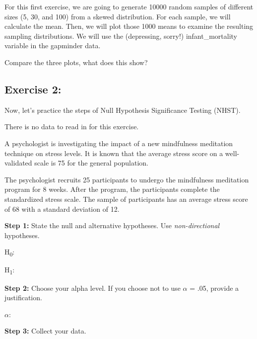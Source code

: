\documentclass[
  letterpaper,
  DIV=11,
  numbers=noendperiod]{scrartcl}
\begin{document}
For this first exercise, we are going to generate 10000 random samples
of different sizes (5, 30, and 100) from a skewed distribution. For each
sample, we will calculate the mean. Then, we will plot those 1000 means
to examine the resulting sampling distributions. We will use the
(depressing, sorry!) infant\_mortality variable in the gapminder data.

Compare the three plots, what does this show?

\subsection{Exercise 2:}\label{exercise-2}

Now, let's practice the steps of Null Hypothesis Significance Testing
(NHST).

\begin{tcolorbox}[enhanced jigsaw, opacityback=0, colbacktitle=quarto-callout-note-color!10!white, colback=white, toptitle=1mm, title=\textcolor{quarto-callout-note-color}{\faInfo}\hspace{0.5em}{Note}, left=2mm, colframe=quarto-callout-note-color-frame, coltitle=black, bottomtitle=1mm, titlerule=0mm, leftrule=.75mm, toprule=.15mm, rightrule=.15mm, bottomrule=.15mm, arc=.35mm, opacitybacktitle=0.6, breakable]

There is no data to read in for this exercise.

\end{tcolorbox}

A psychologist is investigating the impact of a new mindfulness
meditation technique on stress levels. It is known that the average
stress score on a well-validated scale is 75 for the general population.

The psychologist recruits 25 participants to undergo the mindfulness
meditation program for 8 weeks. After the program, the participants
complete the standardized stress scale. The sample of participants has
an average stress score of 68 with a standard deviation of 12.

\textbf{Step 1:} State the null and alternative hypotheses. Use
\emph{non-directional} hypotheses.

H\textsubscript{0}:

H\textsubscript{1}:

\textbf{Step 2:} Choose your alpha level. If you choose not to use
\(\alpha\) = .05, provide a justification.

\(\alpha\):

\textbf{Step 3:} Collect your data.
\end{document}
